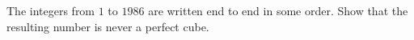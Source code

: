 The integers from $1$ to $1986$ are written end to end in some order. Show that the resulting number is never a perfect cube.

